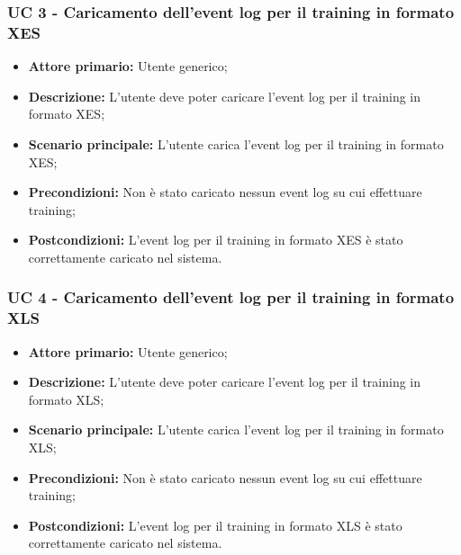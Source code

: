 \subsubsection{UC 3 - Caricamento dell'event log per il training in formato XES}
\begin{itemize}

	\item \textbf{Attore primario:} Utente generico;
	\item \textbf{Descrizione:} L'utente deve poter caricare l'event log per il training in formato XES;
	\item \textbf{Scenario principale:} L'utente carica l'event log per il training in formato XES;
	\item \textbf{Precondizioni:} Non è stato caricato nessun event log su cui effettuare training;
	\item \textbf{Postcondizioni:} L'event log per il training in formato XES è stato correttamente caricato nel sistema.

\end{itemize}



\subsubsection{UC 4 - Caricamento dell'event log per il training in formato XLS}
\begin{itemize}
	\item \textbf{Attore primario:} Utente generico;
	\item \textbf{Descrizione:} L'utente deve poter caricare l'event log per il training in formato XLS;
	\item \textbf{Scenario principale:} L'utente carica l'event log per il training in formato XLS;
	\item \textbf{Precondizioni:} Non è stato caricato nessun event log su cui effettuare training;
	\item \textbf{Postcondizioni:} L'event log per il training in formato XLS è stato correttamente caricato nel sistema.

\end{itemize}



